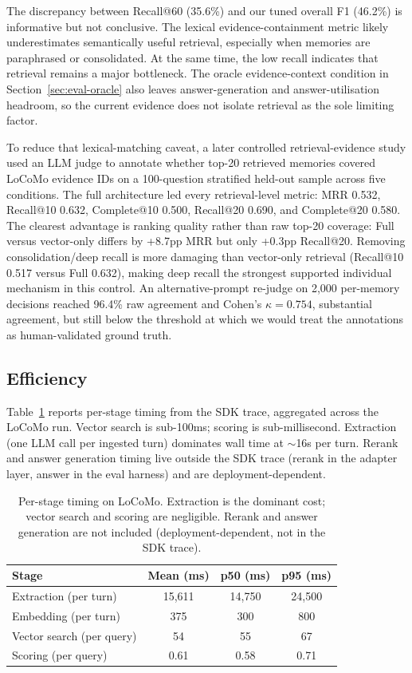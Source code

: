 \documentclass[11pt,a4paper]{article}
\begin{document}
The discrepancy between Recall@60 (35.6\%) and our tuned overall F1 (46.2\%) is informative but not conclusive. The lexical evidence-containment metric likely underestimates semantically useful retrieval, especially when memories are paraphrased or consolidated. At the same time, the low recall indicates that retrieval remains a major bottleneck. The oracle evidence-context condition in Section~\ref{sec:eval-oracle} also leaves answer-generation and answer-utilisation headroom, so the current evidence does not isolate retrieval as the sole limiting factor.

To reduce that lexical-matching caveat, a later controlled retrieval-evidence study used an LLM judge to annotate whether top-20 retrieved memories covered LoCoMo evidence IDs on a 100-question stratified held-out sample across five conditions. The full architecture led every retrieval-level metric: MRR 0.532, Recall@10 0.632, Complete@10 0.500, Recall@20 0.690, and Complete@20 0.580. The clearest advantage is ranking quality rather than raw top-20 coverage: Full versus vector-only differs by +8.7pp MRR but only +0.3pp Recall@20. Removing consolidation/deep recall is more damaging than vector-only retrieval (Recall@10 0.517 versus Full 0.632), making deep recall the strongest supported individual mechanism in this control. An alternative-prompt re-judge on 2,000 per-memory decisions reached 96.4\% raw agreement and Cohen's $\kappa=0.754$, substantial agreement, but still below the threshold at which we would treat the annotations as human-validated ground truth.

\subsection{Efficiency}
\label{sec:eval-efficiency}

Table~\ref{tab:efficiency} reports per-stage timing from the SDK trace, aggregated across the LoCoMo run. Vector search is sub-100ms; scoring is sub-millisecond. Extraction (one LLM call per ingested turn) dominates wall time at $\sim$16s per turn. Rerank and answer generation timing live outside the SDK trace (rerank in the adapter layer, answer in the eval harness) and are deployment-dependent.

\begin{table}[htbp]
\centering
\small
\begin{tabular}{@{}lccc@{}}
\toprule
\textbf{Stage} & \textbf{Mean (ms)} & \textbf{p50 (ms)} & \textbf{p95 (ms)} \\
\midrule
Extraction (per turn) & 15{,}611 & 14{,}750 & 24{,}500 \\
Embedding (per turn) & 375 & 300 & 800 \\
Vector search (per query) & 54 & 55 & 67 \\
Scoring (per query) & 0.61 & 0.58 & 0.71 \\
\bottomrule
\end{tabular}
\caption{Per-stage timing on LoCoMo. Extraction is the dominant cost; vector search and scoring are negligible. Rerank and answer generation are not included (deployment-dependent, not in the SDK trace).}
\label{tab:efficiency}
\end{table}
\end{document}
